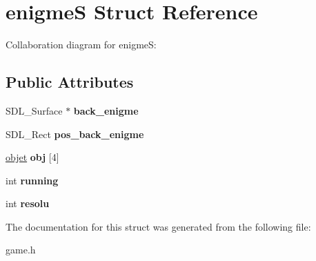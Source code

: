 \hypertarget{structenigmeS}{}\section{enigmeS Struct Reference}
\label{structenigmeS}


Collaboration diagram for enigmeS\+:
\subsection*{Public Attributes}
\begin{DoxyCompactItemize}
\item 
\mbox{\label{structenigmeS_ab1416040ad1aee27728155f9c6466f76}} 
S\+D\+L\+\_\+\+Surface $\ast$ {\bfseries back\+\_\+enigme}
\item 
\mbox{\label{structenigmeS_a779b28e3bdea56b9d88241ab4715ae18}} 
S\+D\+L\+\_\+\+Rect {\bfseries pos\+\_\+back\+\_\+enigme}
\item 
\mbox{\label{structenigmeS_ad3ddbb22ed780d13e5fad504b681aad9}} 
\hyperlink{structobjet}{objet} {\bfseries obj} \mbox{[}4\mbox{]}
\item 
\mbox{\label{structenigmeS_acce82fbd58508e9c588d6eb38141f81c}} 
int {\bfseries running}
\item 
\mbox{\label{structenigmeS_a90891a029d2622d9fba37520a776e693}} 
int {\bfseries resolu}
\end{DoxyCompactItemize}


The documentation for this struct was generated from the following file\+:\begin{DoxyCompactItemize}
\item 
game.\+h\end{DoxyCompactItemize}
